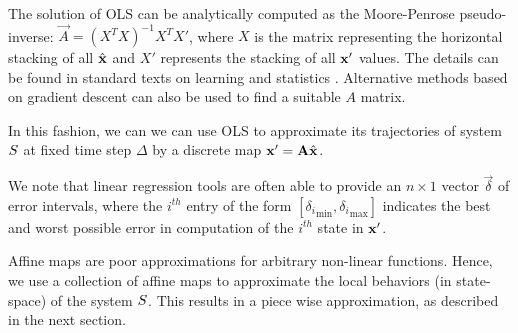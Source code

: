The solution of OLS can be analytically computed as the Moore-Penrose
pseudo-inverse: $\vec{A} = (X^TX)^{-1}X^T X'$, where $X$ is the matrix
representing the horizontal stacking of all $\hat{\mathbf{x}}$ and $X'$
represents the stacking of all $\mathbf{x}'$ values.  The details can be found
in standard texts on learning and statistics
\cite{friedman2001elements}. Alternative methods based on gradient
descent can also be used to find a suitable $A$ matrix.

In this fashion, we can we can use OLS to approximate its trajectories
of system $S$ at fixed time step $\Delta$ by a discrete map $\mathbf{x}'
= \mathbf{A}\hat{\mathbf{x}}$.


We note that linear regression tools are often able to provide an
$n\times 1$ vector $\vec{\delta}$ of error intervals, where the
$i^{th}$ entry of the form $[{\delta_i}_{\min},{\delta_i}_{\max}]$
indicates the best and worst possible error in computation of the
$i^{th}$ state in $\mathbf{x}'$.


Affine maps are poor approximations for arbitrary non-linear
functions. Hence, we use a collection of affine maps to approximate
the local behaviors (in state-space) of the system $S$. This
results in a piece wise approximation, as described in the next
section.





